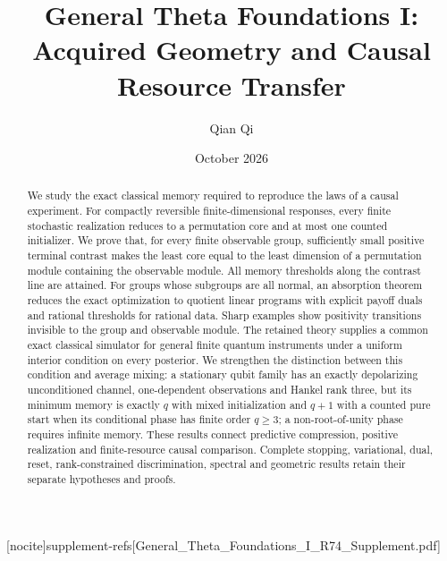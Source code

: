 
[nocite]{supplement-refs}[General_Theta_Foundations_I_R74_Supplement.pdf]
\title[Acquired geometry and causal resource transfer]{General Theta Foundations I:\\Acquired Geometry and Causal Resource Transfer}
\author{Qian Qi}\date{October 2026}

\begin{abstract}
We study the exact classical memory required to reproduce the laws of a
causal experiment. For compactly reversible finite-dimensional responses,
every finite stochastic realization reduces to a permutation core and at
most one counted initializer. We prove that, for every finite observable
group, sufficiently small positive terminal contrast makes the least core
equal to the least dimension of a permutation module containing the
observable module. All memory thresholds
along the contrast line are attained. For groups whose subgroups are all normal,
an absorption theorem reduces the exact optimization to quotient linear
programs with explicit payoff duals and rational thresholds for rational
data. Sharp examples show positivity transitions invisible to the group
and observable module. The retained theory supplies a common exact classical simulator for general
finite quantum instruments under a uniform
interior condition on every posterior. We strengthen the distinction
between this condition and average mixing: a stationary
qubit family has an exactly depolarizing unconditioned channel,
one-dependent observations and Hankel rank three, but its minimum memory
is exactly $q$ with mixed initialization and $q+1$ with a counted pure start
when its conditional phase has finite order $q\ge3$; a non-root-of-unity
phase requires infinite memory. These results connect
predictive compression, positive realization and finite-resource causal
comparison. Complete stopping, variational, dual, reset, rank-constrained
discrimination, spectral and geometric results retain their separate
hypotheses and proofs.
\end{abstract}
\maketitle















